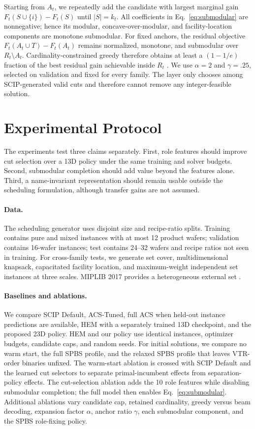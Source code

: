 \documentclass[letterpaper]{article}
\begin{document}
Starting from $A_t$, we repeatedly add the candidate with largest marginal gain $F_t(S\cup\{i\})-F_t(S)$ until $|S|=k_t$.
All coefficients in Eq.~\eqref{eq:submodular} are nonnegative; hence its modular, concave-over-modular, and facility-location components are monotone submodular.
For fixed anchors, the residual objective $F_t(A_t\cup T)-F_t(A_t)$ remains normalized, monotone, and submodular over $R_t\setminus A_t$.
Cardinality-constrained greedy therefore obtains at least a $(1-1/e)$ fraction of the best residual gain achievable inside $R_t$ \cite{nemhauser1978submodular}.
We use $\alpha=2$ and $\gamma=.25$, selected on validation and fixed for every family.
The layer only chooses among SCIP-generated valid cuts and therefore cannot remove any integer-feasible solution.

\section{Experimental Protocol}

The experiments test three claims separately.
First, role features should improve cut selection over a 13D policy under the same training and solver budgets.
Second, submodular completion should add value beyond the features alone.
Third, a name-invariant representation should remain usable outside the scheduling formulation, although transfer gains are not assumed.

\paragraph{Data.}
The scheduling generator uses disjoint size and recipe-ratio splits.
Training contains pure and mixed instances with at most 12 product wafers; validation contains 16-wafer instances; test contains 24--32 wafers and recipe ratios not seen in training.
For cross-family tests, we generate set cover, multidimensional knapsack, capacitated facility location, and maximum-weight independent set instances at three scales.
MIPLIB 2017 provides a heterogeneous external set \cite{gleixner2021miplib}.

\paragraph{Baselines and ablations.}
We compare SCIP Default, ACS-Tuned, full ACS when held-out instance predictions are available, HEM with a separately trained 13D checkpoint, and the proposed 23D policy.
HEM and our policy use identical instances, optimizer budgets, candidate caps, and random seeds.
For initial solutions, we compare no warm start, the full SPBS profile, and the relaxed SPBS profile that leaves VTR-order binaries unfixed.
The warm-start ablation is crossed with SCIP Default and the learned cut selectors to separate primal-incumbent effects from separation-policy effects.
The cut-selection ablation adds the 10 role features while disabling submodular completion; the full model then enables Eq.~\eqref{eq:submodular}.
Additional ablations vary candidate cap, retained cardinality, greedy versus beam decoding, expansion factor $\alpha$, anchor ratio $\gamma$, each submodular component, and the SPBS role-fixing policy.
\end{document}
